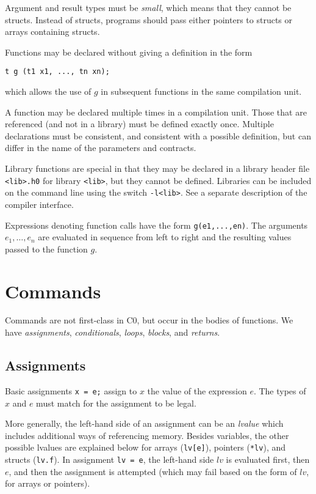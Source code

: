 \documentclass[11pt]{article}
\begin{document}
Argument and result types must be \emph{small}, which means that
they cannot be structs.  Instead of structs, programs should
pass either pointers to structs or arrays containing structs.

Functions may be declared without giving a definition in the form
\begin{verbatim}
t g (t1 x1, ..., tn xn);
\end{verbatim}
which allows the use of $g$ in subsequent functions in the same
compilation unit.

A function may be declared multiple times in a compilation unit.
Those that are referenced (and not in a library) must be defined
exactly once.  Multiple declarations must be consistent, and
consistent with a possible definition, but can differ in the name of
the parameters and contracts.

Library functions are special in that they may be declared in
a library header file \verb'<lib>.h0' for library \verb'<lib>', but
they cannot be defined.  Libraries can be included on the
command line using the switch \verb'-l<lib>'.  See a separate
description of the compiler interface.

Expressions denoting function calls have the form \verb'g(e1,...,en)'.
The arguments $e_1, \ldots, e_n$ are evaluated in sequence from
left to right and the resulting values passed to the function $g$.

\section{Commands}

Commands are not first-class in C0, but occur in the bodies
of functions.  We have \emph{assignments}, \emph{conditionals},
\emph{loops}, \emph{blocks}, and \emph{returns}.

\subsection{Assignments}

Basic assignments \verb'x = e;' assign to $x$ the value
of the expression $e$.  The types of $x$ and $e$ must match
for the assignment to be legal.

More generally, the left-hand side of an assignment can be an
\emph{lvalue} which includes additional ways of referencing memory.
Besides variables, the other possible lvalues are explained below for
arrays (\verb'lv[e]'), pointers (\verb'*lv'), and structs
(\verb'lv.f').  In assignment \verb'lv = e', the left-hand side
$lv$ is evaluated first, then $e$, and then the assignment is
attempted (which may fail based on the form of $lv$, for arrays
or pointers).
\end{document}
